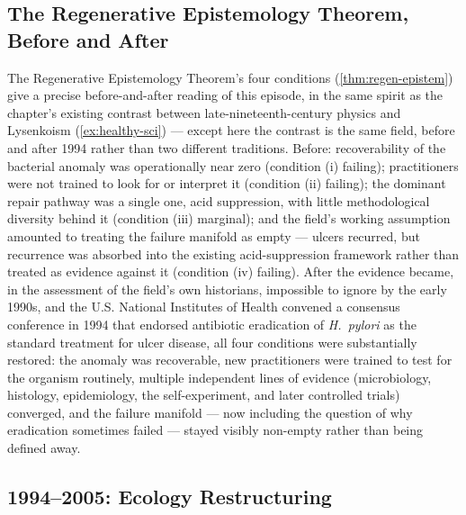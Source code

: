 \documentclass[12pt,twoside,openright]{book}
\begin{document}
\subsection{The Regenerative Epistemology Theorem, Before and After}

The Regenerative Epistemology Theorem's four conditions
(\cref{thm:regen-epistem}) give a precise before-and-after reading
of this episode, in the same spirit as the chapter's existing
contrast between late-nineteenth-century physics and Lysenkoism
(\cref{ex:healthy-sci}) --- except here the contrast is the same
field, before and after 1994 rather than two different
traditions. Before: recoverability of the bacterial anomaly was
operationally near zero (condition (i) failing); practitioners
were not trained to look for or interpret it (condition (ii)
failing); the dominant repair pathway was a single one, acid
suppression, with little methodological diversity behind it
(condition (iii) marginal); and the field's working assumption
amounted to treating the failure manifold as empty --- ulcers
recurred, but recurrence was absorbed into the existing
acid-suppression framework rather than treated as evidence
against it (condition (iv) failing). After the evidence became,
in the assessment of the field's own historians, impossible to
ignore by the early 1990s, and the U.S. National Institutes of
Health convened a consensus conference in 1994 that endorsed
antibiotic eradication of \emph{H.\ pylori} as the standard
treatment for ulcer disease, all four conditions were
substantially restored: the anomaly was recoverable, new
practitioners were trained to test for the organism routinely,
multiple independent lines of evidence (microbiology, histology,
epidemiology, the self-experiment, and later controlled trials)
converged, and the failure manifold --- now including the
question of why eradication sometimes failed --- stayed visibly
non-empty rather than being defined away.

\subsection{1994--2005: Ecology Restructuring}
\end{document}
